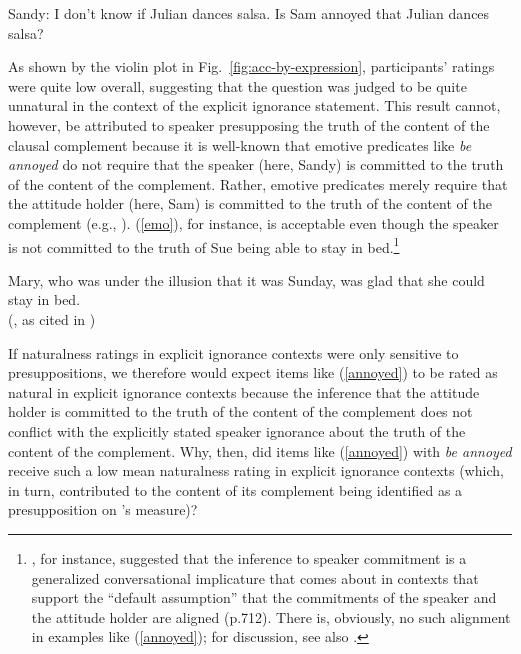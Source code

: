 \documentclass[11pt,fleqn]{article}
\newcommand{\6}{\mbox{$[\hspace*{-.6mm}[$}}
\newcommand{\9}{\mbox{$]\hspace*{-.6mm}]$}}
\newcommand{\citepos}[1]{\citeauthor{#1}'s \citeyear{#1}}
\begin{document}
\begin{exe}
\ex\label{annoyed} Sandy: I don't know if Julian dances salsa. Is Sam annoyed that Julian dances salsa?
\end{exe}
As shown by the violin plot in Fig.~\ref{fig:acc-by-expression}, participants' ratings were quite low overall, suggesting that the question was judged to be quite unnatural in the context of the explicit ignorance statement. This result cannot, however, be attributed to speaker presupposing the truth of the content of the clausal complement because it is well-known that emotive predicates like \emph{be annoyed} do not require that the speaker (here, Sandy) is committed to the truth of the content of the complement. Rather, emotive predicates merely require that the attitude holder (here, Sam) is committed to the truth of the content of the complement (e.g., \citealt{heim92,karttunen2016,djaerv-thesis}). (\ref{emo}), for instance, is acceptable even though the speaker is not committed to the truth of Sue being able to stay in bed.\footnote{\citealt{karttunen2016}, for instance, suggested that the inference to speaker commitment is a generalized conversational implicature that comes about in contexts that support the ``default assumption'' that the commitments of the speaker and the attitude holder are aligned (p.712). There is, obviously, no such alignment in examples like (\ref{annoyed}); for discussion, see also \citealt{djaerv-thesis}.}

\begin{exe}
\ex\label{emo} 
Mary, who was under the illusion that it was Sunday, was glad that she could stay in bed. \\ \hspace*{.2cm} \hfill (\citealt{klein1975}, as cited in \citealt[122]{gazdar79a})
\end{exe}
If naturalness ratings in explicit ignorance contexts were only sensitive to presuppositions, we therefore would expect items like (\ref{annoyed}) to be rated as natural in explicit ignorance contexts because the inference that the attitude holder is committed to the truth of the content of the complement does not conflict with the explicitly stated speaker ignorance about the truth of the content of the complement. Why, then, did items like (\ref{annoyed}) with \emph{be annoyed} receive such a low mean naturalness rating in explicit ignorance contexts (which, in turn, contributed to the content of its complement being identified as a presupposition on \citepos{mandelkern-etal2020} measure)? 
\end{document}
